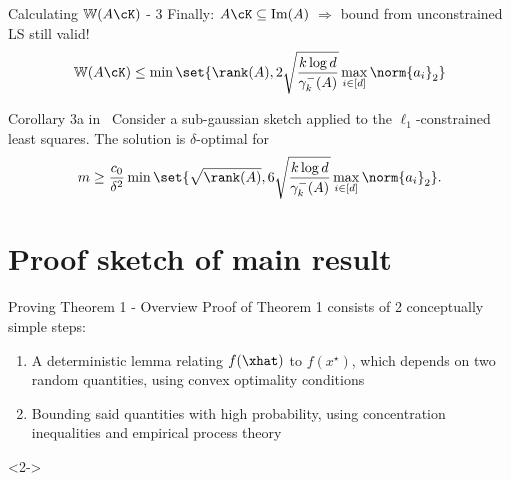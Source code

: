 \documentclass[10pt]{beamer}
\newcommand{\xstar}{x^{\star}}
\begin{document}
\begin{frame}{Calculating $\mathbb{W}(A \cK)$ - 3}
    Finally: $A \cK \subseteq \mathrm{Im}(A)$ $\Rightarrow$ bound from
    unconstrained LS still valid!
    \[
        \mathbb{W}(A\cK) \leq \min\set{\rank(A),
        2 \sqrt{\frac{k \log d}{\gamma_k^-(A)}} \max_{i \in [d]} \norm{a_i}_2}
    \]
    \begin{block}{Corollary 3a in~\cite{PilWain15}}
        Consider a sub-gaussian sketch applied to the $\ell_1$-constrained
        least squares. The solution is $\delta$-optimal for
        \[
            m \geq \frac{c_0}{\delta^2} \min\set{\sqrt{\rank(A)},
            6 \sqrt{\frac{k \log d}{\gamma_k^-(A)}} \max_{i \in [d]}
            \norm{a_i}_2}.
        \]
    \end{block}
\end{frame}

\section{Proof sketch of main result}

\begin{frame}{Proving Theorem 1 - Overview}
    Proof of Theorem 1 consists of 2 conceptually simple steps:
    \begin{enumerate}
    \item<1-> A deterministic lemma relating $f(\xhat)$ to $f(\xstar)$, which
        depends on two random quantities, using convex optimality conditions
    \item<2-> Bounding said quantities with high probability, using
        concentration inequalities and empirical process theory
    \end{enumerate}
    <2->
\end{frame}
\end{document}
